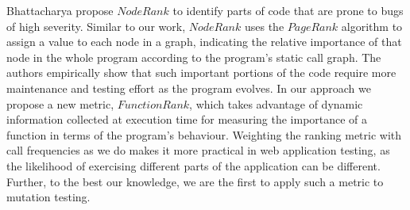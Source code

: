 Bhattacharya \etal \cite{bhattacharya:icse12} propose $NodeRank$ to identify parts of code that are prone to bugs of high severity. 
Similar to our work, $NodeRank$ uses the $PageRank$ algorithm to assign a value to each node in a graph, indicating the relative importance of that node 
in the whole program according to the program's static call graph. The authors empirically show that such important portions of the code require more maintenance and testing effort as the program evolves.
%
In our approach we propose a new metric, $FunctionRank$, which takes advantage of dynamic information collected at execution time for measuring the importance of a function in terms of the program's behaviour. 
Weighting the ranking metric with call frequencies as we do makes it more practical in web application testing, as the likelihood of exercising different parts of the application can be different.
Further, to the best our knowledge, we are the first to apply such a metric to mutation testing.

